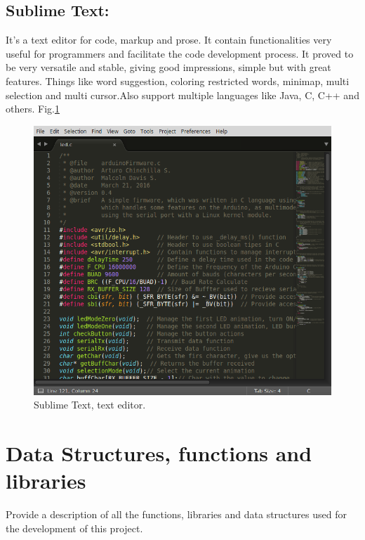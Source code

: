 \documentclass[12pt]{article}
\begin{document}
\subsection{Sublime Text:}
It's a text editor for code, markup and prose. It contain functionalities very  useful for programmers and facilitate the code development process. It proved to be very versatile and stable, giving good impressions, simple but with great features. Things like word suggestion, coloring restricted words, minimap, multi selection and multi cursor.Also support multiple languages like Java, C, C++ and others. Fig.\ref{Sublime}
\begin{figure}[h!]
 	\centering
  	\includegraphics[scale=0.4]
  	{Fig/Sublime_Text.png}    
  	\caption{Sublime Text, text editor.}
    \label{Sublime}
\end{figure}

\section{Data Structures, functions and libraries}
Provide a description of all the functions, libraries and data structures used for the development of this project.
\end{document}
